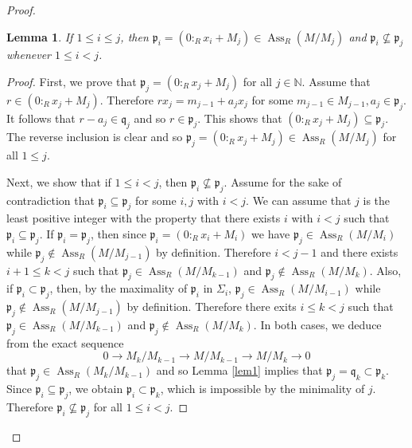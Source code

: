 \documentclass{amsart}
\newtheorem{lem}[thm]{Lemma}
\theoremstyle{definition}
\numberwithin{equation}{section}
\newcommand\ass {\operatorname{Ass}}
\newcommand\fp{\mathfrak p}
\newcommand\fq{\mathfrak q}
\newcommand\N{\mathbb N}
\begin{document}
\begin{proof}
  \begin{lem} If  $1\leq i\leq j$, then $\fp_i=(0:_Rx_i+M_j)\in\ass_R(M/M_j)$ and $\fp_i\nsubseteq\fp_j$ whenever $1\leq i<j$.
  \end{lem}
  \begin{proof}
  First, we prove that $\fp_j=(0:_Rx_j+M_j)$ for all $j\in\N$. Assume that $r\in(0:_Rx_j+M_j)$. Therefore $rx_j=m_{j-1}+a_jx_j$ for some $m_{j-1}\in M_{j-1},a_j\in\fp_j$. It follows that $r-a_j\in\fq_j$ and so $r\in\fp_j$. This shows that $(0:_Rx_j+M_j)\subseteq\fp_j$. The reverse inclusion is clear and so $\fp_j=(0:_Rx_j+M_j)\in\ass_R(M/M_j)$ for all $1\leq j$.

  Next, we show that    if $1\leq i<j$, then $\fp_i\nsubseteq\fp_j$. Assume for the sake of contradiction that $\fp_i\subseteq\fp_j$ for some $i, j$ with $i<j$. We can assume that $j$ is the least positive integer with the property  that there exists $i$ with $i<j$ such that $\fp_i\subseteq\fp_j$. If $\fp_i=\fp_j$, then since $\fp_i=(0:_Rx_i+M_i)$ we have $\fp_j\in\ass_R(M/M_i)$ while $\fp_j\notin\ass_R(M/M_{j-1})$ by definition. Therefore $i<j-1$ and  there exists $i+1\leq k< j$ such that $\fp_j\in\ass_R(M/M_{k-1})$ and $\fp_j\notin\ass_R(M/M_{k})$. Also, if $\fp_i\subset \fp_j$,  then, by the maximality of $\fp_i$ in $\Sigma_i$,  $\fp_j\in\ass_R(M/M_{i-1})$ while  $\fp_j \notin\ass_R(M/M_{j-1})$ by definition. Therefore there exits $i\leq k <j$ such that $\fp_j\in\ass_R(M/M_{k-1})$ and $\fp_j\notin\ass_R(M/M_k)$. In both cases,
  we deduce from the exact sequence
 $$0\rightarrow M_k/M_{k-1}\rightarrow M/M_{k-1}\rightarrow M/M_k\rightarrow 0$$
 that $\fp_j\in\ass_R(M_k/M_{k-1})$ and so Lemma \ref{lem1} implies that $\fp_j=\fq_k\subset\fp_k$. Since $\fp_i\subseteq\fp_j$, we obtain $\fp_i\subset\fp_k$, which is impossible by the minimality of $j$. Therefore $\fp_i\nsubseteq\fp_j$ for all $1\leq i<j$.


\end{proof}
\end{proof}
\end{document}
